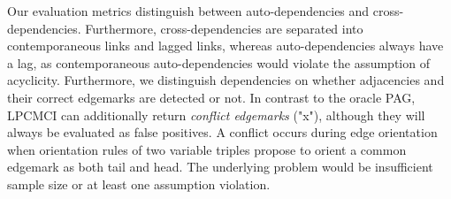 \documentclass[conference]{IEEEtran}
\begin{document}
Our evaluation metrics distinguish between auto-dependencies and cross-dependencies. Furthermore, cross-dependencies are separated into contemporaneous links and lagged links, whereas auto-dependencies always have a lag, as contemporaneous auto-dependencies would violate the assumption of acyclicity.
Furthermore, we distinguish dependencies on whether adjacencies and their correct edgemarks are detected or not. In contrast to the oracle PAG, LPCMCI can additionally return \textit{conflict edgemarks} ("x"), although they will always be evaluated as false positives.
A conflict occurs during edge orientation when orientation rules of two variable triples propose to orient a common edgemark as both tail and head\cite{runge_pcmci_2020}. The underlying problem would be insufficient sample size or at least one assumption violation\cite{runge_tigramite_2022}.
\end{document}
